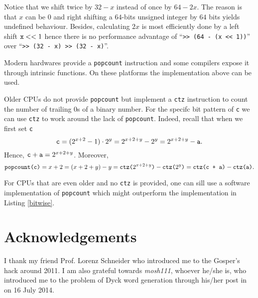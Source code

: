 \documentclass[a4paper]{article}
\begin{document}
Notice that we shift twice by $32 - x$ instead of once by $64 - 2x$.
The reason is that $x$ can be $0$ and right shifting a $64$-bits unsigned integer by $64$ bits yields undefined behaviour.
Besides, calculating $2x$ is most efficiently done by a left shift $\verb!x! << 1$ hence there is no performance advantage of ``\verb!>> (64 - (x << 1))!'' over ``\verb!>> (32 - x) >> (32 - x)!''.

Modern hardwares provide a \verb!popcount! instruction and some compilers expose it through intrinsic functions.
On these platforms the implementation above can be used.

Older CPUs do not provide \verb!popcount! but implement a \verb!ctz! instruction to count the number of trailing 0s of a binary number.
For the specifc bit pattern of \verb!c! we can use \verb!ctz! to work around the lack of \verb!popcount!.
Indeed, recall that when we first set \verb!c! 
\[
\verb!c! = (2^{x + 2} - 1)\cdot 2^y = 2^{x + 2 + y} - 2^y = 2^{x + 2 + y} - \verb!a!.
\]
Hence, $\verb!c! + \verb!a! = 2^{x + 2 + y}$.
Moreover,
\[
\verb!popcount(c)! = x + 2 = (x + 2 + y) - y = \verb!ctz(!2^{x + 2 + y}\verb!)! - \verb!ctz(!2^y\verb!)! = \verb!ctz(c + a)! - \verb!ctz(a)!.
\]

For CPUs that are even older and no \verb!ctz! is provided, one can sill use a software implementation \cite{Wikipedia-Popcount} of \verb!popcount! which might outperform the implementation in Listing \ref{bitwise}.



\section{Acknowledgements}

I thank my friend Prof. Lorenz Schneider who introduced me to the Gosper's hack around 2011.
I am also grateful towards {\em mosh111}, whoever he/she is, who introduced me to the problem of Dyck word generation through his/her post in \cite{CareerCup} on 16 July 2014.
\end{document}
